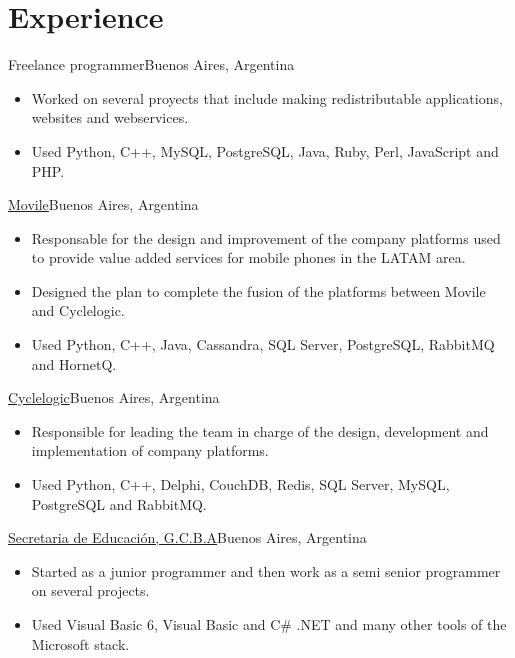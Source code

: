 \documentclass[a4paper,11pt]{moderncv}
\newcommand\weblink[2] {{\color{href} \href{#1}{#2}}}
\begin{document}
\pagebreak

\section{Experience}
{Freelance programmer}{Buenos Aires, Argentina}{}{%
\begin{itemize}
  \item Worked on several proyects that include making redistributable
  applications, websites and webservices.
  \item Used Python, C++, MySQL, PostgreSQL, Java, Ruby, Perl, JavaScript and
  PHP.
\end{itemize}
}
%
{\weblink{http://www.movile.com}{Movile}}{Buenos Aires, Argentina}{}{%
\begin{itemize}
  \item Responsable for the design and improvement of the company platforms
  used to provide value added services for mobile phones in the LATAM area.
  \item Designed the plan to complete the fusion of the platforms between
  Movile and Cyclelogic.
  \item Used Python, C++, Java, Cassandra, SQL Server, PostgreSQL, RabbitMQ and
  HornetQ.
\end{itemize}
}
%
{\weblink{http://www.cyclelogic.com}{Cyclelogic}}{Buenos Aires, Argentina}{}{%
\begin{itemize}
  \item Responsible for leading the team in charge of the design, development
  and implementation of company platforms.
  \item Used Python, C++, Delphi, CouchDB, Redis, SQL Server, MySQL, PostgreSQL
  and RabbitMQ.
\end{itemize}
}
%
{\weblink{http://www.cyclelogic.com}{Secretaria de Educación, G.C.B.A}}{Buenos Aires, Argentina}{}{%
\begin{itemize}
  \item Started as a junior programmer and then work as a semi senior programmer on
  several projects.
  \item Used Visual Basic 6, Visual Basic and C\# .NET and many other tools of
  the Microsoft stack.
\end{itemize}
}
%
\end{document}
